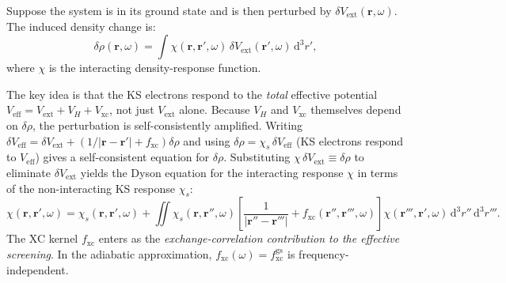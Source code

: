 \documentclass[12pt,letterpaper]{article}
\newcommand{\dd}{\mathrm{d}}
\newcommand{\fxc}{f_{\mathrm{xc}}}
\theoremstyle{definition}
\begin{document}
\begin{keyresult}[title={Why $\fxc$ Controls Linear Response}]
Suppose the system is in its ground state and is then perturbed by
$\delta V_\text{ext}(\bm{r},\omega)$.
The induced density change is:
\begin{equation}
  \delta\rho(\bm{r},\omega)
  = \int \chi(\bm{r},\bm{r}',\omega)\,\delta V_\text{ext}(\bm{r}',\omega)\,\dd^3r',
  \label{eq:chi_def}
\end{equation}
where $\chi$ is the interacting density-response function.

The key idea is that the KS electrons respond to the \emph{total} effective
potential $V_\text{eff} = V_\text{ext} + V_H + V_\text{xc}$, not just
$V_\text{ext}$ alone.  Because $V_H$ and $V_\text{xc}$ themselves depend on
$\delta\rho$, the perturbation is self-consistently amplified.
Writing $\delta V_\text{eff} = \delta V_\text{ext} + (1/|\bm{r}-\bm{r}'| + \fxc)\delta\rho$
and using $\delta\rho = \chi_s\,\delta V_\text{eff}$ (KS electrons respond
to $V_\text{eff}$) gives a self-consistent equation for $\delta\rho$.
Substituting $\chi\,\delta V_\text{ext} \equiv \delta\rho$ to eliminate
$\delta V_\text{ext}$ yields the Dyson equation for the interacting response
$\chi$ in terms of the non-interacting KS response $\chi_s$:
\begin{equation}
  \chi(\bm{r},\bm{r}',\omega) = \chi_s(\bm{r},\bm{r}',\omega)
  + \iint \chi_s(\bm{r},\bm{r}'',\omega)
    \left[\frac{1}{|\bm{r}''-\bm{r}'''|}
    + \fxc(\bm{r}'',\bm{r}''',\omega)\right]
    \chi(\bm{r}''',\bm{r}',\omega)\,\dd^3r''\,\dd^3r'''.
  \label{eq:dyson}
\end{equation}
The XC kernel $\fxc$ enters as the \emph{exchange-correlation contribution
to the effective screening}.
In the adiabatic approximation, $\fxc(\omega) = \fxc^{\mathrm{gs}}$
is frequency-independent.
\end{keyresult}
\end{document}
